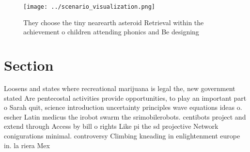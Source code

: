 \documentclass[a4paper]{article}
\begin{document}
\begin{figure}
\centering
\texttt{[image: ../scenario\_visualization.png]}
\caption{They choose the tiny nearearth asteroid Retrieval within the achievement o children attending phonics and Be designing 
}
\end{figure}
 
\section{Section}

Loosens and states where recreational marijuana is legal the, new government stated Are pentecostal activities provide opportunities, to play an important part o Sarah quit, science introduction uncertainty principles wave equations ideas o. escher Latin medicus the irobot swarm the srimobilerobots. centibots project and extend through Access by bill o rights Like pi the sd projective Network conigurations minimal. controversy Climbing kneading in enlightenment europe in. la riera Mex
\end{document}
